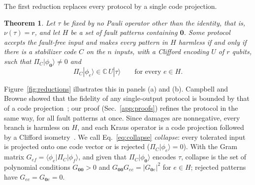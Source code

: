 \documentclass[aps,prl,reprint,twocolumn,amsmath,amssymb,floatfix,nofootinbib,superscriptaddress]{revtex4-2}
\newtheorem{theorem}{Theorem}
\begin{document}
The first reduction replaces every protocol by a single code projection.
\begin{theorem}\label{thm:code}
Let $\tau$ be fixed by no Pauli operator other than the identity, that is, $\nu(\tau)=r$, and let $H$ be a set of fault patterns containing $\mathbf 0$. Some protocol accepts the fault-free input and makes every pattern in $H$ harmless if and only if there is a stabilizer code $C$ on the $n$ inputs, with a Clifford encoding $U$ of $r$ qubits, such that $\Pi_C|\phi_{\mathbf0}\rangle\neq0$ and
\begin{equation}
 \Pi_C|\phi_e\rangle\in\mathbb C\,U|\tau\rangle\qquad\text{for every }e\in H.
 \label{eq:collapse}
\end{equation}
\end{theorem}

Figure~\ref{fig:reductions} illustrates this in panels (a) and (b). Campbell and Browne showed that the fidelity of any single-output protocol is bounded by that of a code projection~\cite{campbellbrowne}; our proof (Sec.~\ref{app:proofs}) refines the protocol in the same way, for all fault patterns at once. Since damages are nonnegative, every branch is harmless on $H$, and each Kraus operator is a code projection followed by a Clifford isometry~\cite{fattal}. We call Eq.~\eqref{eq:collapse} \emph{collapse}: every tolerated input is projected onto one code vector or is rejected ($\Pi_C|\phi_e\rangle=0$). With the Gram matrix $G_{ef}=\langle\phi_e|\Pi_C|\phi_f\rangle$, and given that $\Pi_C|\phi_{\mathbf0}\rangle$ encodes $\tau$, collapse is the set of polynomial conditions $G_{\mathbf0\mathbf0}>0$ and $G_{\mathbf0\mathbf0}G_{ee}=|G_{\mathbf0e}|^2$ for $e\in H$; rejected patterns have $G_{ee}=G_{\mathbf0e}=0$.
\end{document}
